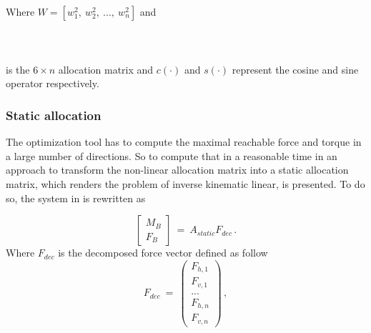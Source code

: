 Where $W = [w_1^2,\ w_2^2,\ ...,\ w_n^2]$ and\\\\
\\\\
is the $6 \times n$ allocation matrix and $c(\cdot)$ and $s(\cdot)$ represent the
cosine and sine operator respectively.

\subsubsection{Static allocation}
\label{sec:allocation}
The optimization tool has to compute the maximal reachable force and torque in
a large number of directions. So to compute that in a reasonable time in
\citep{kamel_voliro:_2018} an approach to transform the non-linear allocation matrix
into a static allocation matrix, which renders the problem of inverse kinematic
linear, is presented. To do so, the system in \Cref{force_eq_alloc} is rewritten as

\begin{equation}
  \label{static_force_eq}
    \begin{bmatrix}
      M_B \\
      F_B
    \end{bmatrix} \ = \
    A_{static}F_{dec}
    \, .
\end{equation}
Where $F_{dec}$ is the decomposed force vector defined as follow
\begin{equation}
  \label{f_dec}
    F_{dec} \ = \
    \begin{pmatrix}
      F_{h,1} \\
      F_{v,1} \\
      ... \\
      F_{h,n} \\
      F_{v,n}
    \end{pmatrix} \, ,
\end{equation}

